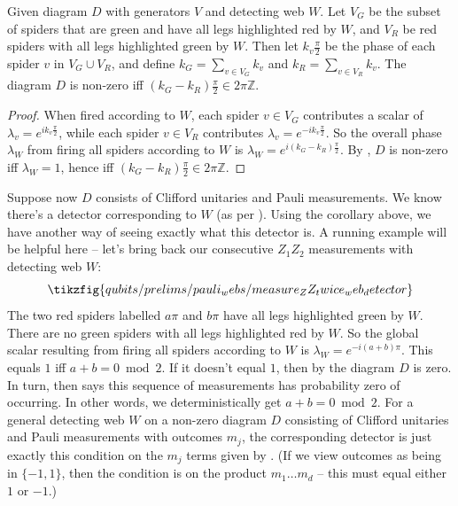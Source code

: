 \begin{corollary}\label{cor:firing-detector-web-exact-scalar}
    Given diagram $D$ with generators $V$ and detecting web $W$.
    Let $V_G$ be the subset of spiders that are green and have all legs highlighted red by $W$, and $V_R$ be red spiders with all legs highlighted green by $W$.
    Then let $k_v\frac{\pi}{2}$ be the phase of each spider $v$ in $V_G \cup V_R$, and define $k_G = \sum_{v \in V_G} k_v$ and $k_R = \sum_{v \in V_R} k_v$.
    The diagram $D$ is non-zero iff $(k_G - k_R)\frac{\pi}{2} \in 2\pi\mathbb{Z}$.
    \begin{proof}
        When fired according to $W$, each spider $v \in V_G$ contributes a scalar of $\lambda_v = e^{ik_v\frac{\pi}{2}}$, while each spider $v \in V_R$ contributes $\lambda_v = e^{-ik_v\frac{\pi}{2}}$.
        So the overall phase $\lambda_W$ from firing all spiders according to $W$ is $\lambda_W = e^{i(k_G - k_R)\frac{\pi}{2}}$.
        By , $D$ is non-zero iff $\lambda_W = 1$, hence iff $(k_G - k_R)\frac{\pi}{2} \in 2\pi\mathbb{Z}$.
    \end{proof}
\end{corollary}

Suppose now $D$ consists of Clifford unitaries and Pauli measurements.
We know there's a detector corresponding to $W$ (as per ).
Using the corollary above, we have another way of seeing exactly what this detector is.
A running example will be helpful here -- let's bring back our consecutive $Z_1Z_2$ measurements with detecting web $W$:
\begin{equation}
    \tikzfig{qubits/prelims/pauli_webs/measure_ZZ_twice_web_detector}
\end{equation}
The two red spiders labelled $a\pi$ and $b\pi$ have all legs highlighted green by $W$.
There are no green spiders with all legs highlighted red by $W$.
So the global scalar resulting from firing all spiders according to $W$ is $\lambda_W = e^{-i(a + b)\pi}$.
This equals $1$ iff $a + b = 0 \bmod 2$.
If it doesn't equal $1$, then by  the diagram $D$ is zero.
In turn,  then says this sequence of measurements has probability zero of occurring.
In other words, we deterministically get $a + b = 0 \bmod 2$.
For a general detecting web $W$ on a non-zero diagram $D$ consisting of Clifford unitaries and Pauli measurements with outcomes $m_j$, the corresponding detector is just exactly this condition on the $m_j$ terms given by .
(If we view outcomes as being in $\{-1, 1\}$, then the condition is on the product $m_1 \ldots m_d$ -- this must equal either $1$ or $-1$.)

